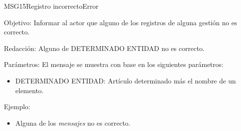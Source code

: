 \begin{mensaje}{MSG15}{Registro incorrecto}{Error}
	\item [Objetivo:] Informar al actor que alguno de los registros de alguna gestión no es correcto.
	\item[Redacción:] Alguno de DETERMINADO ENTIDAD no es correcto.
	\item[Parámetros:] El mensaje se muestra con base en los siguientes parámetros:
	\begin{itemize}
		\item DETERMINADO ENTIDAD: Artículo determinado más el nombre de un elemento.
	\end{itemize}
	\item[Ejemplo:] \begin{itemize}
		\item Alguna de los {\em mensajes} no es correcto.
	\end{itemize}
\end{mensaje}